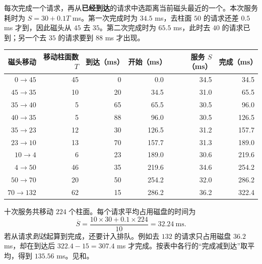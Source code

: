\begin{checkedsolution}
每次完成一个请求，再从\textbf{已经到达}的请求中选距离当前磁头最近的一个。本次服务耗时为 $S=30+0.1T$ ms。第一次完成时为 $34.5$ ms，去柱面 $50$ 的请求还差 $0.5$ ms 才到，因此磁头从 $45$ 去 $35$。第二次完成时为 $65.5$ ms，此时去 $40$ 的请求已到；另一个去 $35$ 的请求要到 $88$ ms 才出现。

\begin{center}
\small
\begin{tabular}{@{}rrrrrr@{}}
\toprule
磁头移动 & 移动柱面数 $T$ & 到达（ms） & 开始（ms） & 服务 $S$（ms） & 完成（ms） \\
\midrule
$0\to45$   &45 & 0 &   0.0 &34.5 & 34.5 \\
$45\to35$  &10 &20 &  34.5 &31.0 & 65.5 \\
$35\to40$  & 5 &65 &  65.5 &30.5 & 96.0 \\
$40\to35$  & 5 &88 &  96.0 &30.5 &126.5 \\
$35\to23$  &12 &30 & 126.5 &31.2 &157.7 \\
$23\to10$  &13 &70 & 157.7 &31.3 &189.0 \\
$10\to4$   & 6 &23 & 189.0 &30.6 &219.6 \\
$4\to50$   &46 &35 & 219.6 &34.6 &254.2 \\
$50\to70$  &20 &50 & 254.2 &32.0 &286.2 \\
$70\to132$ &62 &15 & 286.2 &36.2 &322.4 \\
\bottomrule
\end{tabular}
\end{center}

十次服务共移动 $224$ 个柱面。每个请求平均占用磁盘的时间为
\[
 \overline S=\frac{10\times30+0.1\times224}{10}
            =\boxed{32.24\ \mathrm{ms}}.
\]
若从请求\emph{到达}起算到完成，还要计入排队。例如去 $132$ 的请求只占用磁盘 $36.2$ ms，却在到达后 $322.4-15=307.4$ ms 才完成。按表中各行的“完成减到达”取平均，得到 $135.56$ ms。见和。
\end{checkedsolution}

\endgroup
